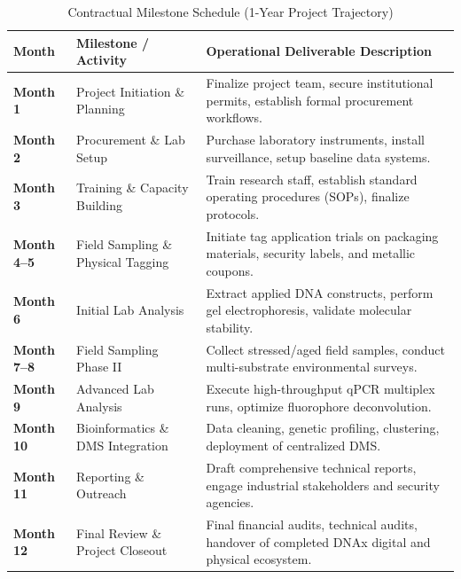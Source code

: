 \begin{table}[H]
\centering
\small
\caption*{Contractual Milestone Schedule (1-Year Project Trajectory)}
\label{tab:contractual_milestones}
\begin{tabularx}{\textwidth}{l p{4.5cm} p{7.5cm}}
\toprule
\textbf{Month} & \textbf{Milestone / Activity} & \textbf{Operational Deliverable Description} \\
\midrule
\textbf{Month 1} & Project Initiation \& Planning & Finalize project team, secure institutional permits, establish formal procurement workflows. \\
\textbf{Month 2} & Procurement \& Lab Setup & Purchase laboratory instruments, install surveillance, setup baseline data systems. \\
\textbf{Month 3} & Training \& Capacity Building & Train research staff, establish standard operating procedures (SOPs), finalize protocols. \\
\textbf{Month 4--5} & Field Sampling \& Physical Tagging & Initiate tag application trials on packaging materials, security labels, and metallic coupons. \\
\textbf{Month 6} & Initial Lab Analysis & Extract applied DNA constructs, perform gel electrophoresis, validate molecular stability. \\
\textbf{Month 7--8} & Field Sampling Phase II & Collect stressed/aged field samples, conduct multi-substrate environmental surveys. \\
\textbf{Month 9} & Advanced Lab Analysis & Execute high-throughput qPCR multiplex runs, optimize fluorophore deconvolution. \\
\textbf{Month 10} & Bioinformatics \& DMS Integration & Data cleaning, genetic profiling, clustering, deployment of centralized DMS. \\
\textbf{Month 11} & Reporting \& Outreach & Draft comprehensive technical reports, engage industrial stakeholders and security agencies. \\
\textbf{Month 12} & Final Review \& Project Closeout & Final financial audits, technical audits, handover of completed DNAx digital and physical ecosystem. \\
\bottomrule
\end{tabularx}
\end{table}
